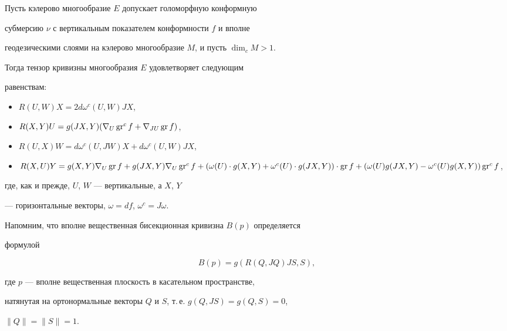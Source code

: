 \begin{thms}\label{th2.2}


Пусть кэлерово многообразие $E$ допускает голоморфную конформную


субмерсию $\nu$ с вертикальным показателем конформности $f$ и вполне


геодезическими слоями на кэлерово многообразие $M$, и пусть $\dim_cM>1$.


Тогда тензор кривизны многообразия $E$ удовлетворяет следующим


равенствам$:$


\begin{itemize}


\item[а)] $R(U,W)X=2d\omega^c(U,W)JX$,


\item[б)] $R(X,Y)U=g(JX,Y)(\nabla_U\operatorname{gr}^c f+\nabla_{JU}\operatorname{gr} f)$,


\item[в)] $R(U,X)W=d\omega^c(U,JW)X+d\omega^c(U,W)JX$,


\item[г)] $R(X,U)Y=g(X,Y)\nabla_U\GR f+g(JX,Y)\nabla_U\gr^c f+


(\omega (U)\cdot g(X,Y)+\omega^c(U)\cdot g(JX,Y))\cdot \GR f+


(\omega (U)g(JX,Y)-\omega^c(U)g(X,Y))\gr^c f$,


\end{itemize}


где, как и прежде, $U$, $W$ --- вертикальные, а $X$, $Y$


--- горизонтальные векторы, $\omega =df$, $\omega^c=J\omega$.


\end{thms}





Напомним, что вполне вещественная бисекционная кривизна $B(p)$ определяется


формулой


$$


B(p)=g(R(Q,JQ)JS,S),


$$


где $p$ --- вполне вещественная плоскость в касательном пространстве,


натянутая на ортонормальные векторы $Q$ и $S$, т.\,е. $g(Q,JS)=g(Q,S)=0$,


$\|Q\|=\|S\|=1$.






